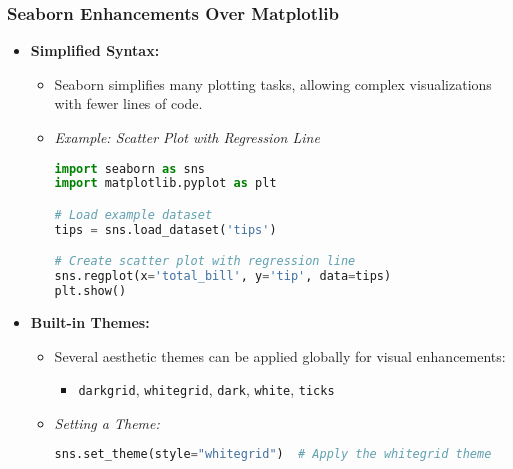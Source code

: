 \documentclass{beamer}
\begin{document}
\begin{frame}[fragile]
    \frametitle{Seaborn Enhancements Over Matplotlib}
    
    \begin{itemize}
        \item \textbf{Simplified Syntax:} 
        \begin{itemize}
            \item Seaborn simplifies many plotting tasks, allowing complex visualizations with fewer lines of code.
            
            \item \textit{Example: Scatter Plot with Regression Line}
            \begin{lstlisting}[language=Python]
import seaborn as sns
import matplotlib.pyplot as plt

# Load example dataset
tips = sns.load_dataset('tips')

# Create scatter plot with regression line
sns.regplot(x='total_bill', y='tip', data=tips)
plt.show()
            \end{lstlisting}
        \end{itemize}
        
        \item \textbf{Built-in Themes:}
        \begin{itemize}
            \item Several aesthetic themes can be applied globally for visual enhancements:
            \begin{itemize}
                \item \texttt{darkgrid}, \texttt{whitegrid}, \texttt{dark}, \texttt{white}, \texttt{ticks}
            \end{itemize}
            
            \item \textit{Setting a Theme:}
            \begin{lstlisting}[language=Python]
sns.set_theme(style="whitegrid")  # Apply the whitegrid theme
            \end{lstlisting}
        \end{itemize}
    \end{itemize}
\end{frame}
\end{document}
